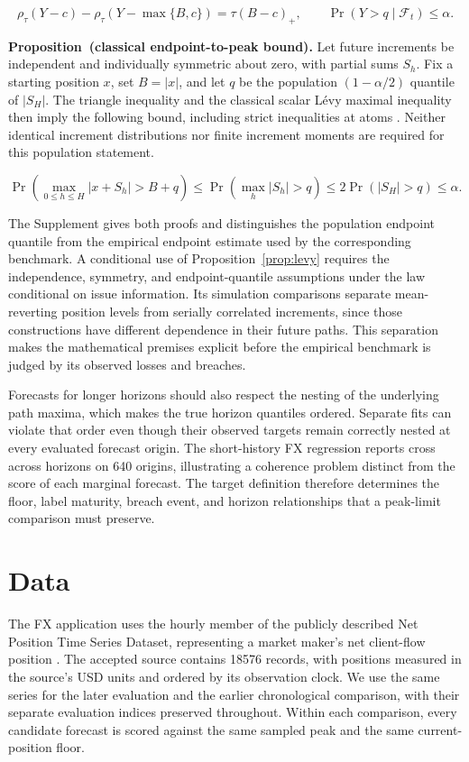 \documentclass[11pt,a4paper]{article}
\newcounter{proposition}
\begin{document}
\[
\rho_\tau(Y-c)-\rho_\tau(Y-\max\{B,c\})=\tau(B-c)_+,\qquad \Pr(Y>q\mid\mathcal F_t)\le\alpha.
\]

\noindent\textbf{Proposition~\theproposition (classical endpoint-to-peak bound).}\label{prop:levy} Let future increments be independent and individually symmetric about zero, with partial sums \(S_h\). Fix a starting position \(x\), set \(B=|x|\), and let \(q\) be the population \((1-\alpha/2)\) quantile of \(|S_H|\). The triangle inequality and the classical scalar L\'evy maximal inequality then imply the following bound, including strict inequalities at atoms \citep{sussman2023}. Neither identical increment distributions nor finite increment moments are required for this population statement.


\[
\Pr\!\left(\max_{0\le h\le H}|x+S_h|>B+q\right)\le\Pr\!\left(\max_h|S_h|>q\right)\le2\Pr(|S_H|>q)\le\alpha.
\]

The Supplement gives both proofs and distinguishes the population endpoint quantile from the empirical endpoint estimate used by the corresponding benchmark. A conditional use of Proposition~\ref{prop:levy} requires the independence, symmetry, and endpoint-quantile assumptions under the law conditional on issue information. Its simulation comparisons separate mean-reverting position levels from serially correlated increments, since those constructions have different dependence in their future paths. This separation makes the mathematical premises explicit before the empirical benchmark is judged by its observed losses and breaches.


Forecasts for longer horizons should also respect the nesting of the underlying path maxima, which makes the true horizon quantiles ordered. Separate fits can violate that order even though their observed targets remain correctly nested at every evaluated forecast origin. The short-history FX regression reports cross across horizons on 640 origins, illustrating a coherence problem distinct from the score of each marginal forecast. The target definition therefore determines the floor, label maturity, breach event, and horizon relationships that a peak-limit comparison must preserve.


\FloatBarrier

\section{Data}\label{sec:data}

The FX application uses the hourly member of the publicly described Net Position Time Series Dataset, representing a market maker's net client-flow position \citep{dataset,wisniewski2020}. The accepted source contains 18576 records, with positions measured in the source's USD units and ordered by its observation clock. We use the same series for the later evaluation and the earlier chronological comparison, with their separate evaluation indices preserved throughout. Within each comparison, every candidate forecast is scored against the same sampled peak and the same current-position floor.
\end{document}
